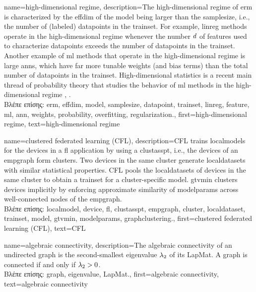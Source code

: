 {name={high-dimensional regime}, 
	description={The 
		high-dimensional regime of \gls{erm} is characterized by the \gls{effdim} of the \gls{model} 
		being larger than the \gls{samplesize}, i.e., the number of (labeled) \gls{datapoint}s in the \gls{trainset}. 
		For example, \gls{linreg} methods operate in the high-dimensional regime whenever the number $d$ of \gls{feature}s 
		used to characterize \gls{datapoint}s exceeds the number of \gls{datapoint}s in the \gls{trainset}. 
		Another example of \gls{ml} methods that operate in the high-dimensional regime is large \gls{ann}s, which have 
		far more tunable \gls{weights} (and bias terms) than the total number of \gls{datapoint}s in the \gls{trainset}. 
		High-dimensional statistics is a recent main thread of \gls{probability} theory that studies the 
		behavior of \gls{ml} methods in the high-dimensional regime \cite{Wain2019}, \cite{BuhlGeerBook}.\\
		\foreignlanguage{greek}{Βλέπε επίσης:} \gls{erm}, \gls{effdim}, \gls{model}, \gls{samplesize}, \gls{datapoint}, \gls{trainset}, 
		\gls{linreg}, \gls{feature}, \gls{ml}, \gls{ann}, \gls{weights}, \gls{probability}, \gls{overfitting}, \gls{regularization}.},
   	first={high-dimensional regime},
   	text={high-dimensional regime}
}
	
{name={clustered federated learning (CFL)}, 
	description={CFL trains \gls{localmodel}s for the 
 		\gls{device}s in a \gls{fl} application by using a \gls{clustasspt}, i.e., the \gls{device}s 
 		of an \gls{empgraph} form \gls{cluster}s. Two \gls{device}s in the same \gls{cluster} generate 
 		\gls{localdataset}s with similar statistical properties. CFL pools the \gls{localdataset}s of \gls{device}s 
 		in the same \gls{cluster} to obtain a \gls{trainset} for a \gls{cluster}-specific \gls{model}. 
 		\Gls{gtvmin} clusters \gls{device}s implicitly by enforcing approximate similarity of \gls{modelparams} 
 		across well-connected nodes of the \gls{empgraph}.\\
		\foreignlanguage{greek}{Βλέπε επίσης:}  \gls{localmodel}, \gls{device}, \gls{fl}, \gls{clustasspt}, \gls{empgraph}, 
		\gls{cluster}, \gls{localdataset}, \gls{trainset}, \gls{model}, \gls{gtvmin}, \gls{modelparams}, \gls{graphclustering}.}, 
	first={clustered federated learning (CFL)},
	text={CFL} 
}

{name={algebraic connectivity},
	description={The algebraic connectivity of an undirected \gls{graph} 
		is the second-smallest \gls{eigenvalue} $\lambda_{2}$ of its \gls{LapMat}. A \gls{graph} is connected if and only if 
		$\lambda_{2} >0$.\\
		\foreignlanguage{greek}{Βλέπε επίσης:} \gls{graph}, \gls{eigenvalue}, \gls{LapMat}.},
	first={algebraic connectivity},
	text={algebraic connectivity}
}

